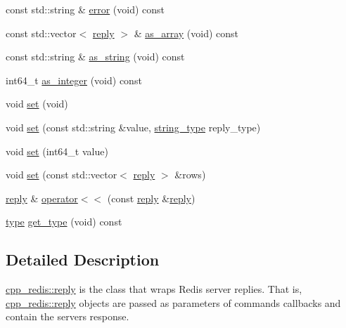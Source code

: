 \begin{DoxyCompactItemize}
\item 
const std\+::string \& \mbox{\hyperlink{classcpp__redis_1_1reply_a8e4d3fe1636627fdee6361705a2b1c1e}{error}} (void) const
\item 
const std\+::vector$<$ \mbox{\hyperlink{classcpp__redis_1_1reply}{reply}} $>$ \& \mbox{\hyperlink{classcpp__redis_1_1reply_af4ead6a79c9e531912c35267d5212776}{as\+\_\+array}} (void) const
\item 
const std\+::string \& \mbox{\hyperlink{classcpp__redis_1_1reply_a5fdd9c1d3bb3b9ece6098f8b83a32597}{as\+\_\+string}} (void) const
\item 
int64\+\_\+t \mbox{\hyperlink{classcpp__redis_1_1reply_a5f54d0dada956bca564ff2d7bde866ea}{as\+\_\+integer}} (void) const
\item 
void \mbox{\hyperlink{classcpp__redis_1_1reply_a2489d293128b2d567663a9d7fbbbc33e}{set}} (void)
\item 
void \mbox{\hyperlink{classcpp__redis_1_1reply_a9306dcc36a6a009a2b0f4923735f6349}{set}} (const std\+::string \&value, \mbox{\hyperlink{classcpp__redis_1_1reply_ac192ba4cb8f2bb6e7cb465edf755328b}{string\+\_\+type}} reply\+\_\+type)
\item 
void \mbox{\hyperlink{classcpp__redis_1_1reply_a2443bd6d4fb35279db198ba876e1ad34}{set}} (int64\+\_\+t value)
\item 
void \mbox{\hyperlink{classcpp__redis_1_1reply_ab64ee3720832e60ed47b91fd5b3045bd}{set}} (const std\+::vector$<$ \mbox{\hyperlink{classcpp__redis_1_1reply}{reply}} $>$ \&rows)
\item 
\mbox{\hyperlink{classcpp__redis_1_1reply}{reply}} \& \mbox{\hyperlink{classcpp__redis_1_1reply_a4f2a05711b5db6b53108cb9eec4e19be}{operator$<$$<$}} (const \mbox{\hyperlink{classcpp__redis_1_1reply}{reply}} \&\mbox{\hyperlink{classcpp__redis_1_1reply}{reply}})
\item 
\mbox{\hyperlink{classcpp__redis_1_1reply_acc272b2a52164cac1d110c619a0b25bd}{type}} \mbox{\hyperlink{classcpp__redis_1_1reply_ab196726881aea799186228d49a2283ba}{get\+\_\+type}} (void) const
\end{DoxyCompactItemize}


\subsection{Detailed Description}
\mbox{\hyperlink{classcpp__redis_1_1reply}{cpp\+\_\+redis\+::reply}} is the class that wraps Redis server replies. That is, \mbox{\hyperlink{classcpp__redis_1_1reply}{cpp\+\_\+redis\+::reply}} objects are passed as parameters of commands callbacks and contain the server\textquotesingle{}s response. 

